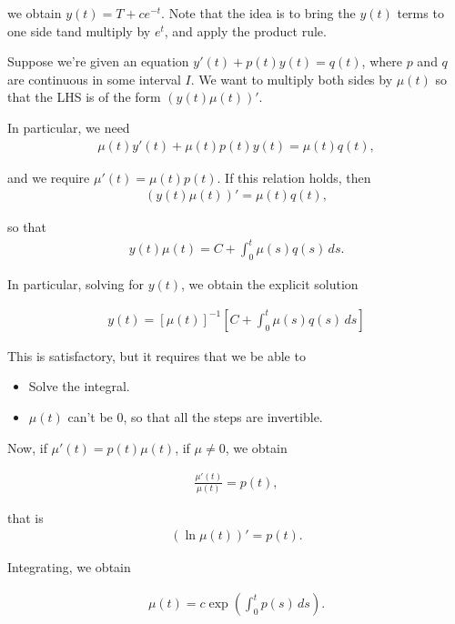 \documentclass{article}
\begin{document}
we obtain $y(t) = T + c e^{-t}$.  Note that the idea is to bring the $y(t)$ terms to one side tand multiply by $e^t$, and apply the product rule.

Suppose we're given an equation $y'(t) + p(t) y(t) = q(t)$, where $p$ and $q$ are continuous in some interval $I$.  We want to multiply both sides by $\mu(t)$ so that the LHS is of the form  $(y(t) \mu(t))'$.

In particular, we need 
\begin{align*}
  \mu(t) y'(t) + \mu(t) p(t) y(t) = \mu(t) q(t),
\end{align*}

and we require $\mu'(t) = \mu(t) p(t)$.  If this relation holds, then
\begin{align*}
  (y(t) \mu(t))'  = \mu(t) q(t),
\end{align*}

so that
\begin{align*}
  y(t) \mu(t)  = C + \int_{0}^{t} \mu(s) q(s) \, ds.
\end{align*}

In particular, solving for $y(t)$, we obtain the explicit solution

\begin{align*}
  y(t)  = \left[ \mu(t) \right]^{-1} \left[ C + \int_{0}^{t} \mu(s) q(s) \, ds \right]
\end{align*}

This is satisfactory, but it requires that we be able to

\begin{itemize}
  \item Solve the integral.
  \item $\mu(t)$ can't be 0, so that all the steps are invertible.
\end{itemize}

Now, if $\mu'(t) = p(t) \mu(t)$, if $\mu \neq 0$, we obtain

\begin{align*}
  \frac{\mu'(t)}{\mu(t)} = p(t),
\end{align*}

that is
\begin{align*}
  (\ln \mu(t))' = p(t).
\end{align*}

Integrating, we obtain

\begin{align*}
  \mu(t) =  c \exp \left( \int_{0}^{t} p(s) \, ds \right).
\end{align*}
\end{document}
